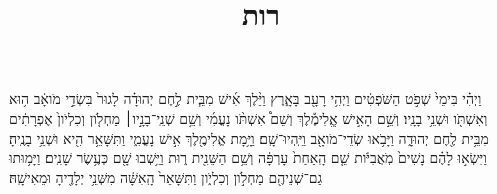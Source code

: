 \documentclass{openreader}
\title{רות}
\date{}
\begin{document}
\maketitle
\raggedbottom 
\fontsize{16pt}{24pt}\selectfont


וַיְהִ֗י בִּימֵי֙ שְׁפֹ֣ט הַשֹּׁפְטִ֔ים וַיְהִ֥י רָעָ֖ב בָּאָ֑רֶץ וַיֵּ֨לֶךְ אִ֜ישׁ מִבֵּ֧ית לֶ֣חֶם יְהוּדָ֗ה לָגוּר֙ בִּשְׂדֵ֣י מֹואָ֔ב ה֥וּא וְאִשְׁתֹּ֖ו וּשְׁנֵ֥י בָנָֽיו׃ 
וְשֵׁ֣ם הָאִ֣ישׁ אֱֽלִימֶ֡לֶךְ וְשֵׁם֩ אִשְׁתֹּ֨ו נָעֳמִ֜י וְשֵׁ֥ם שְׁנֵֽי־בָנָ֣יו׀ מַחְלֹ֤ון וְכִלְיֹון֙ אֶפְרָתִ֔ים מִבֵּ֥ית לֶ֖חֶם יְהוּדָ֑ה וַיָּבֹ֥אוּ שְׂדֵי־מֹואָ֖ב וַיִּֽהְיוּ־שָֽׁם׃ 
וַיָּ֥מָת אֱלִימֶ֖לֶךְ אִ֣ישׁ נָעֳמִ֑י וַתִּשָּׁאֵ֥ר הִ֖יא וּשְׁנֵ֥י בָנֶֽיהָ׃ 
וַיִּשְׂא֣וּ לָהֶ֗ם נָשִׁים֙ מֹֽאֲבִיֹּ֔ות שֵׁ֤ם הָֽאַחַת֙ עָרְפָּ֔ה וְשֵׁ֥ם הַשֵּׁנִ֖ית ר֑וּת וַיֵּ֥שְׁבוּ שָׁ֖ם כְּעֶ֥שֶׂר שָׁנִֽים׃ 
וַיָּמ֥וּתוּ גַם־שְׁנֵיהֶ֖ם מַחְלֹ֣ון וְכִלְיֹ֑ון וַתִּשָּׁאֵר֙ הָֽאִשָּׁ֔ה מִשְּׁנֵ֥י יְלָדֶ֖יהָ וּמֵאִישָֽׁהּ׃ 
\end{document}
